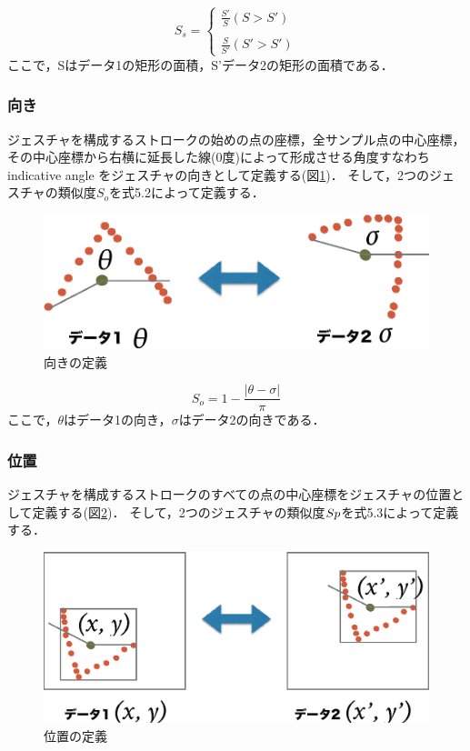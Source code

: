 \begin{equation}
S_\textit{s} = \left \{
\begin{array}{l}
\frac{S'}{S} (S>S') \\\\
\frac{S}{S'} (S'>S')
\end{array}
\right.
\end{equation}
ここで，Sはデータ1の矩形の面積，S'データ2の矩形の面積である．

\subsubsection{向き}
ジェスチャを構成するストロークの始めの点の座標，全サンプル点の中心座標，その中心座標から右横に延長した線(0度)によって形成させる角度すなわち indicative angle をジェスチャの向きとして定義する(図\ref{fig:v_orientation})．
そして，2つのジェスチャの類似度$S_\textit{o}$を式5.2によって定義する．

\begin{figure} [h!]
	\begin{center}
		\includegraphics [width=0.6\hsize ]{img/v_orientation.eps}
	\end{center}
	\caption{向きの定義}
	\label{fig:v_orientation}
\end{figure}

\begin{equation}
S_\textit{o} = 1 - \frac{|\theta - \sigma|}{\pi}
\end{equation}
ここで，$\theta$はデータ1の向き，$\sigma$はデータ2の向きである．


\subsubsection{位置}
ジェスチャを構成するストロークのすべての点の中心座標をジェスチャの位置として定義する(図\ref{fig:v_position})．
そして，2つのジェスチャの類似度$S{\scriptsize p}$を式5.3によって定義する．

\begin{figure} [h!]
	\begin{center}
		\includegraphics [width=0.6\hsize ]{img/v_position.eps}
	\end{center}
	\caption{位置の定義}
	\label{fig:v_position}
\end{figure}


